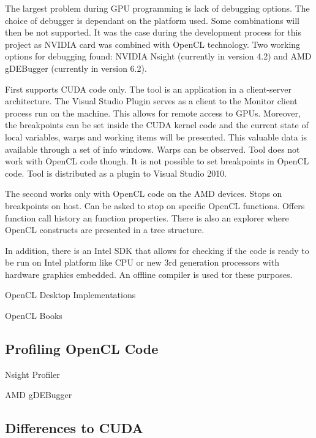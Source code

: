 The largest problem during GPU programming is lack of debugging options. The choice of debugger is dependant on the platform used. Some combinations will then be not supported. It was the case during the development process for this project as NVIDIA card was combined with OpenCL technology.  Two working options for debugging found: NVIDIA Nsight (currently in version 4.2) and AMD gDEBugger (currently in version 6.2).

First supports CUDA code only. The tool is an application in a client-server architecture.  The Visual Studio Plugin serves as a client to the Monitor client process run on the machine. This allows for remote access to GPUs. Moreover, the breakpoints can be set inside the CUDA kernel code and the current state of local variables, warps and working items will be presented. This valuable data is available through a set of info windows. Warps can be observed. Tool does not work with OpenCL code though. It is not possible to set breakpoints in OpenCL code. Tool is distributed as a plugin to Visual Studio 2010.

The second works only with OpenCL code on the AMD devices. Stops on breakpoints on host. Can be asked to stop on specific OpenCL functions. Offers function call history an function properties. There is also an explorer where OpenCL constructs are presented in a tree structure.

In addition, there is an Intel SDK that allows for checking if the code is ready to be run on Intel platform like CPU or new 3rd generation processors with hardware graphics embedded. An offline compiler is used tor these purposes. 

OpenCL Desktop Implementations

OpenCL Books


\subsection{Profiling OpenCL Code}

Nsight Profiler

AMD gDEBugger

\subsection{Differences to CUDA}



